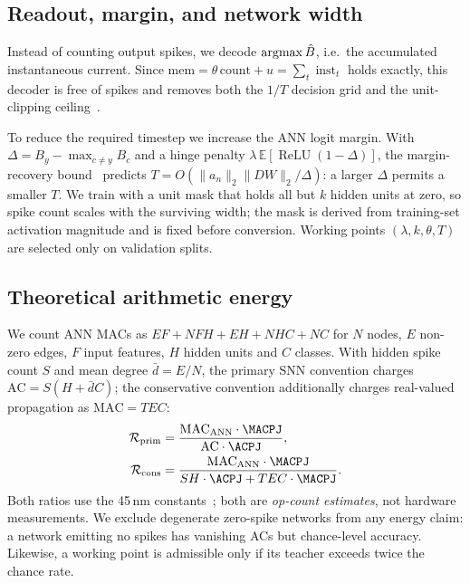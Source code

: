 \subsection{Readout, margin, and network width}
\label{ssec:components}

Instead of counting output spikes, we decode $\operatorname{argmax}\hat{B}$, i.e.\ the accumulated instantaneous current. Since $\mathrm{mem}=\theta\,\mathrm{count}+u=\sum_t \operatorname{inst}_t$ holds exactly, this decoder is free of spikes and removes both the $1/T$ decision grid and the unit-clipping ceiling~\cite{dualphase2024}.

To reduce the required timestep we increase the ANN logit margin. With $\Delta = B_{y} - \max_{c\ne y} B_c$ and a hinge penalty $\lambda\,\mathbb{E}[\operatorname{ReLU}(1-\Delta)]$, the margin-recovery bound~\cite{deng2021} predicts $T = O(\|a_n\|_2\|DW\|_2/\Delta)$: a larger $\Delta$ permits a smaller $T$. We train with a unit mask that holds all but $k$ hidden units at zero, so spike count scales with the surviving width; the mask is derived from training-set activation magnitude and is fixed before conversion. Working points $(\lambda, k, \theta, T)$ are selected only on validation splits.

\subsection{Theoretical arithmetic energy}
\label{ssec:energy}

We count ANN MACs as $EF + NFH + EH + NHC + NC$ for $N$ nodes, $E$ non-zero edges, $F$ input features, $H$ hidden units and $C$ classes. With hidden spike count $S$ and mean degree $\bar d = E/N$, the primary SNN convention charges
$\mathrm{AC} = S (H + \bar d C)$;
the conservative convention additionally charges real-valued propagation as $\mathrm{MAC}=T E C$:
\begin{align}
\mathcal{R}_{\mathrm{prim}} &= \frac{\mathrm{MAC}_{\mathrm{ANN}}\cdot\MACPJ}{\mathrm{AC}\cdot\ACPJ},
\label{eq:energy}\\
\mathcal{R}_{\mathrm{cons}} &= \frac{\mathrm{MAC}_{\mathrm{ANN}}\cdot\MACPJ}{S H\cdot\ACPJ + T E C\cdot\MACPJ}.
\notag
\end{align}
Both ratios use the 45\,nm constants~\cite{horowitz2014}; both are \emph{op-count estimates}, not hardware measurements. We exclude degenerate zero-spike networks from any energy claim: a network emitting no spikes has vanishing ACs but chance-level accuracy. Likewise, a working point is admissible only if its teacher exceeds twice the chance rate.

